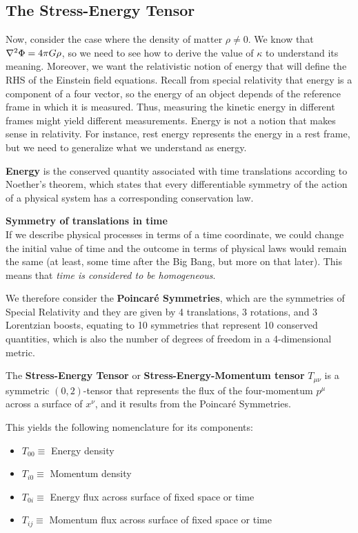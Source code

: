 \documentclass{article}
\begin{document}
 	\subsection{The Stress-Energy Tensor}
 		Now, consider the case where the density of matter $\rho \neq 0$. We know that $\nabla^2 \Phi = 4\pi G \rho$, so we need to see how to derive the value of $\kappa$ to understand its meaning. Moreover, we want the relativistic notion of energy that will define the RHS of the Einstein field equations. Recall from special relativity that energy is a component of a four vector, so the energy of an object depends of the reference frame in which it is measured. Thus, measuring the kinetic energy in different frames might yield different measurements. Energy is not a notion that makes sense in relativity. For instance, rest energy represents the energy in a rest frame, but we need to generalize what we understand as energy.
 		\begin{defn}
 			\textbf{Energy} is the conserved quantity associated with time translations according to Noether's theorem, which states that every differentiable symmetry of the action of a physical system has a corresponding conservation law.
 		\end{defn}
 		\begin{exmp}
 			\textbf{Symmetry of translations in time}\\
 			If we describe physical processes in terms of a time coordinate, we could change the initial value of time and the outcome in terms of physical laws would remain the same (at least, some time after the Big Bang, but more on that later). This means that \textit{time is considered to be homogeneous}.
 		\end{exmp}
 		We therefore consider the \textbf{Poincar\'{e} Symmetries}, which are the symmetries of Special Relativity and they are given by 4 translations, 3 rotations, and 3 Lorentzian boosts, equating to 10 symmetries that represent 10 conserved quantities, which is also the number of degrees of freedom in a 4-dimensional metric.
 		\begin{defn}
 			The \textbf{Stress-Energy Tensor} or \textbf{Stress-Energy-Momentum tensor} $T_{\mu\nu}$ is a symmetric $(0,2)$-tensor that represents the flux of the four-momentum $p^\mu$ across a surface of $x^\nu$, and it results from the Poincar\'{e} Symmetries.
 		\end{defn}
 		This yields the following nomenclature for its components:
 		\begin{multicols}{2}
 			\begin{itemize}
 				\item $T_{00} \equiv $ Energy density
 				\item $T_{i0} \equiv $ Momentum density\\
 				\item $T_{0i} \equiv $ Energy flux across surface of fixed space or time
 				\item $T_{ij} \equiv $ Momentum flux across surface of fixed space or time
 			\end{itemize}
 		\end{multicols}
\end{document}
